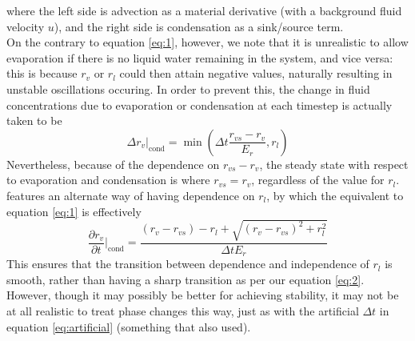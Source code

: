 \documentclass[11pt]{article}
\begin{document}
where the left side is advection as a material derivative (with a background fluid velocity $u$), and the right side is condensation as a sink/source term. \\
On the contrary to equation \ref{eq:1}, however, we note that it is unrealistic to allow evaporation if there is no liquid water remaining in the system, and vice versa: this is because $r_v$ or $r_l$ could then attain negative values, naturally resulting in unstable oscillations occuring. In order to prevent this, the change in fluid concentrations due to evaporation or condensation at each timestep is actually taken to be
\begin{equation} \label{eq:2}
\Delta r_v|_{\text{cond}} = \min\left(\Delta t\frac{r_{vs} - r_v}{E_r},r_l\right)
\end{equation}
Nevertheless, because of the dependence on $r_{vs} - r_v$, the steady state with respect to evaporation and condensation is where $r_{vs}=r_v$, regardless of the value for $r_l$. \\
\citet[p.~324]{Jaehn2015} features an alternate way of having dependence on $r_l$, by which the equivalent to equation \ref{eq:1} is effectively
\[
\frac{\partial r_v}{\partial t}|_{\text{cond}} = \frac{\left(r_v-r_{vs}\right)-r_l+\sqrt{\left(r_v-r_{vs}\right)^2+r_l^2}}{\Delta t E_r}
\]
This ensures that the transition between dependence and independence of $r_l$ is smooth, rather than having a sharp transition as per our equation \ref{eq:2}. However, though it may possibly be better for achieving stability, it may not be at all realistic to treat phase changes this way, just as with the artificial $\Delta t$ in equation \ref{eq:artificial} (something that \citeauthor{Jaehn2015} also used).
\end{document}
